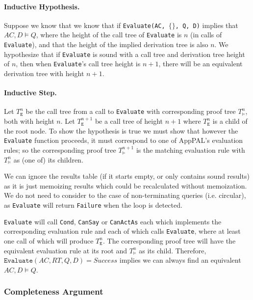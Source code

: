 \documentclass[thesis.tex]{subfiles}
\begin{document}
\paragraph*{Inductive Hypothesis.} Suppose we know that we know that
if \texttt{Evaluate(AC, $\{\}$, Q, D)} implies that $AC,D\models{Q}$,
where the height of the call tree of \texttt{Evaluate} is $n$ (in
calls of \texttt{Evaluate}), and that the height of the implied
derivation tree is also $n$.  We hypothesize that if \texttt{Evaluate}
is sound with a call tree and derivation tree height of $n$, then when
\texttt{Evaluate}'s call tree height is $n+1$, there will be an
equivalent derivation tree with height $n+1$.

\paragraph*{Inductive Step.}  Let $T_{\mathtt{E}}^n$ be the call tree
from a call to \texttt{Evaluate} with corresponding proof tree
$T_{\models}^n$, both with height $n$.  Let $T_{\mathtt{E}}^{n+1}$ be a
call tree of height $n+1$ where $T_{\mathtt{E}}^n$ is a child of the
root node. To show the hypothesis is true we must show that
however the \texttt{Evaluate} function proceeds, it must correspond to one
of AppPAL's evaluation rules; so the corresponding proof tree
$T_{\models}^{n+1}$ is the matching evaluation rule with $T_{\models}^n$
as (one of) its children.

We can ignore the results table (if it starts empty, or only contains
sound results) as it is just memoizing results which could be
recalculated without memoization.  We do not need to consider to the
case of non-terminating queries (i.e. circular), as \texttt{Evaluate}
will return \texttt{Failure} when the loop is detected.

\texttt{Evaluate} will call \texttt{Cond}, \texttt{CanSay} or
\texttt{CanActAs} each which implements the corresponding evaluation
rule and each of which calls \texttt{Evaluate}, where at least one
call of which will produce $T_{\mathtt{E}}^n$.  The corresponding
proof tree will have the equivalent evaluation rule at its root and
$T_{\models}^n$ as its child.  Therefore, $\mathtt{Evaluate}(AC, RT, Q,
D) = \textit{Success}$ implies we can always find an equivalent $AC, D
\models Q.$

\subsubsection*{Completeness Argument}
\end{document}
